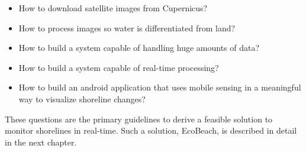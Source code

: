\begin{itemize}
    \item How to download satellite images from Cupernicus?
    \item How to process images so water is differentiated from land?
    \item How to build a system capable of handling huge amounts of data? 
    \item How to build a system capable of real-time processing?
    \item How to build an android application that uses mobile sensing in a meaningful way to visualize shoreline changes?
\end{itemize}
\noindent
These questions are the primary guidelines to derive a feasible solution to monitor shorelines in real-time. Such a solution, EcoBeach, is described in detail in the next chapter.
